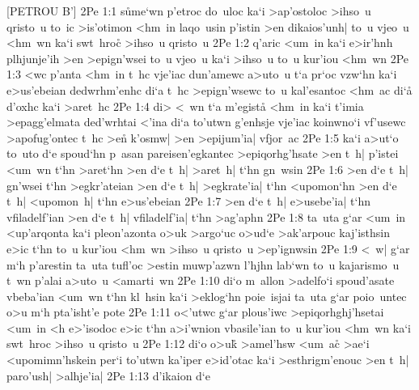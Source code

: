 [PETROU B']
\vs 2Pe 1:1
s\r{u}me`wn
p'etroc
do~uloc
ka`i
>ap'ostoloc
>ihso~u
qristo~u
to~ic
>is'otimon
<hm~in
laqo~usin
p'istin
>en
dikaios'unh|
to~u
vjeo~u
<hm~wn
ka`i
swt~hro\r{c}
>ihso~u
qristo~u\bibvsend
\vs 2Pe 1:2
q'aric
<um~in
ka`i
e>ir'hnh
plhjunje'ih
>en
>epign'wsei
to~u
vjeo~u
ka`i
>ihso~u
to~u
kur'iou
<hm~wn\bibvsend
\vs 2Pe 1:3
<wc
p'anta
<hm~in
t~hc
vje'iac
dun'amewc
a>uto~u
t`a
pr`oc
vzw`hn
ka`i
e>us'ebeian
dedwrhm'enhc
di`a
t~hc
>epign'wsewc
to~u
kal'esantoc
<hm~ac
di`a\r{}
d'oxhc
ka`i
>aret~hc\bibvsend
\vs 2Pe 1:4
di>
<~wn
t`a
m'egista\r{}
<hm~in
ka`i
t'imia
>epagg'elmata
ded'wrhtai
<'ina
di`a
to'utwn
g'enhsje
vje'iac
koinwno`i
vf'usewc
>apofug'ontec
t~hc
>e\r{n}
k'osmw|
>en
>epijum'ia|
vfjor~ac\bibvsend
\vs 2Pe 1:5
ka`i
a>ut`o
to~uto
d`e
spoud`hn
p~asan
pareisen'egkantec
>epiqorhg'hsate
>en
t~h|
p'istei
<um~wn
t`hn
>aret`hn
>en
d`e
t~h|
>aret~h|
t`hn
gn~wsin\bibvsend
\vs 2Pe 1:6
>en
d`e
t~h|
gn'wsei
t`hn
>egkr'ateian
>en
d`e
t~h|
>egkrate'ia|
t`hn
<upomon`hn
>en
d`e
t~h|
<upomon~h|
t`hn
e>us'ebeian\bibvsend
\vs 2Pe 1:7
>en
d`e
t~h|
e>usebe'ia|
t`hn
vfiladelf'ian
>en
d`e
t~h|
vfiladelf'ia|
t`hn
>ag'aphn\bibvsend
\vs 2Pe 1:8
ta~uta
g`ar
<um~in
<up'arqonta
ka`i
pleon'azonta
o>uk
>argo`uc
o>ud`e
>ak'arpouc
kaj'isthsin
e>ic
t`hn
to~u
kur'iou
<hm~wn
>ihso~u
qristo~u
>ep'ignwsin\bibvsend
\vs 2Pe 1:9
<~w|
g`ar
m`h
p'arestin
ta~uta
tufl'oc
>estin
muwp'azwn
l'hjhn
lab`wn
to~u
kajarismo~u
t~wn
p'alai
a>uto~u
<amarti~wn\bibvsend
\vs 2Pe 1:10
di`o
m~allon
>adelfo`i
spoud'asate
vbeba'ian
<um~wn
t`hn
kl~hsin
ka`i
>eklog`hn
poie~isjai
ta~uta
g`ar
poio~untec
o>u
m`h
pta'isht'e
pote\bibvsend
\vs 2Pe 1:11
o<'utwc
g`ar
plous'iwc
>epiqorhghj'hsetai
<um~in
<h
e>'isodoc
e>ic
t`hn
a>i'wnion
vbasile'ian
to~u
kur'iou
<hm~wn
ka`i
swt~hroc
>ihso~u
qristo~u\bibvsend
\vs 2Pe 1:12
di`o
o>uk\r{}
>amel'hsw
<um~ac\r{}
>ae`i
<upomimn'hskein
per`i
to'utwn
ka'iper
e>id'otac
ka`i
>esthrigm'enouc
>en
t~h|
paro'ush|
>alhje'ia|\bibvsend
\vs 2Pe 1:13
d'ikaion
d`e
